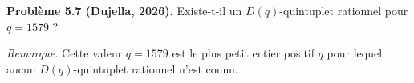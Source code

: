 \textbf{Problème 5.7 (Dujella, 2026).} Existe-t-il un $D(q)$-quintuplet rationnel pour $q=1579$ ?

\medskip

\textit{Remarque.} Cette valeur $q=1579$ est le plus petit entier positif $q$ pour lequel aucun $D(q)$-quintuplet rationnel n'est connu.
